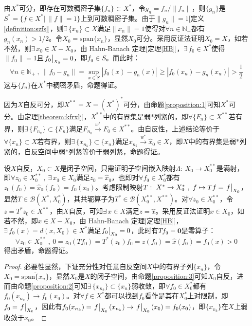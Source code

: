 \begin{proposition}[1. 若$X^*$可分，则$X$可分]\label{proposition:1}
由$X^*$可分，即存在可数稠密子集$\{f_n\} \subset X^*$，令$g_n=f_n/\|f_n\|$，则$\{g_n\}$是$S^*=\{f \in X^*| \ \|f\|=1\}$上到可数稠密子集。由于$\|g_n\|=1$[定义\ref{definition:szfs}]，则$\exists \, \{x_n\} \subset X$满足$\|x_n\|=1$使得对$\forall n \in \mathbb{N}_+$都有$g_n(x_n)>1/2$。令$X_0=\text{span}\{x_n\}$，显然$X_0$可分。采用反证法证明$X_0=X$，如若不然，则$\exists \, x_0 \in X-X_0$，由 Hahn-Banach 定理[定理\ref{HB}]，$\exists \, f_0 \in X^*$使得$\|f_0\|=1$且$\eval{f_0}_{X_0}=0$，即$f_0 \in S$。而此时：
\[\forall n \in \mathbb{N}_+ \ , \ \|f_0-g_n\|=\sup_{x \in S}|f_0(x)-g_n(x)| \geq |f_0(x_n)-g_n(x_n)|>\frac{1}{2}\]
这与$\{f_n\}$在$X^*$中稠密矛盾，命题得证。
\end{proposition}
\begin{proposition}\label{proposition:2}
因为$X$自反可分，即$X^{**}=X=(X^*)^*$可分，由命题\ref{proposition:1}可知$X^*$可分。由定理\ref{theorem:kfrxlj}，$X^{**}$中的有界集是弱$*$列紧的，即$\forall \{F_n\} \subset X^{**}$若有界，则$\exists \, \{F_{n_k}\} \subset \{F_n\}$满足$F_{n_k} \xrightarrow{w^*} F_0 \in X^{**}$。由自反性，上述结论等价于$\forall \{x_n\} \subset X$若有界，则$\exists \, \{x_{n_k}\} \subset \{x_n\}$满足$x_{n_k} \xrightarrow{w^*} \hat{x}_0 \in X$，即$X$中的有界集是弱$*$列紧的，自反空间中弱$*$列紧等价于弱列紧，命题得证。
\end{proposition}
\begin{proposition}[3. 自反空间的闭子空间也自反]\label{proposition:3}
设$X$自反，$X_0 \subset X$是闭子空间，只需证明子空间嵌入映射$\Lambda: \ X_0 \to X_0^{**}$是满射，即$\forall z_0 \in X_0^{**} \ , \ \exists \, x_0 \in X_0$满足$z_0=\hat{x}_0$，也即对$\forall f_0 \in X_0^*$都有$z_0(f_0)=\hat{x}_0(f_0)=f_0(x_0)$。考虑限制映射$T: \ X^* \to X_0^* \ , \ f \mapsto Tf=\eval{f}_{X_0}$，显然$T \in \mathscr{B}(X^*,X_0^*)$，其共轭算子为$T^* \in \mathscr{B}(X_0^{**},X^{**})$。对$\forall z_0 \in X_0^{**}$，令$z=T^*z_0 \in X^{**}$，由$X$自反，可知$\exists \, x \in X$满足$z=\hat{x}$。采用反证法证明$x \in X_0$，如若不然，即$x \in X-X_0$，由 Hahn-Banach 定理[定理\ref{HB}]，$\exists \, f_0(x)=d(x,X_0) \in X^*$满足$\eval{f_0}_{X_0}=0$，此时有$Tf_0=\mathbf{0}$是零算子：
\[\forall z_0 \in X_0^{**} \ , \ 0=z_0(Tf_0)=T^*(z_0)f_0=z(f_0)=\hat{x}(f_0)=f_0(x)>0\]
得出矛盾，命题得证。
\end{proposition}
\begin{proof}
必要性显然，下证充分性对任意自反空间$X$中的有界子列$\{x_n\}$，令$X_0=\overline{\text{span}\{x_n\}}$，显然$X_0$是$X$的闭子空间，由命题\ref{proposition:3}可知$X_0$自反，进而由命题\ref{proposition:2}可知$\exists \, \{x_{n_k}\} \subset \{x_n\}$弱收敛，即$\forall f_0 \in X_0^*$都有$f_0(x_{n_k}) \to f_0(x_0)$。对$\forall f \in X^*$都可以找到$f_0$看作是其在$X_0^*$上对限制，即$f_0=\eval{f}_{X_0}$，因此有$f_0(x_{n_k})=\eval{f}_{X_0}(x_{n_k}) \to \eval{f}_{X_0}(x_0)=f_0(x_0)$，即$\{x_{n_k}\}$在$X$上弱收敛于$x_0$。
\end{proof}

